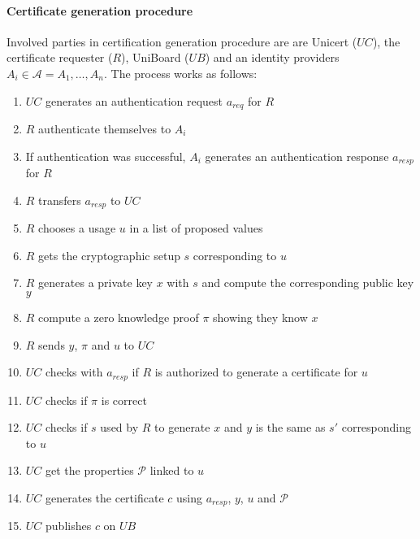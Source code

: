\documentclass[bibtotoc,halfparskip,oneside]{scrreprt}
\begin{document}
\paragraph*{Certificate generation procedure}
Involved parties in certification generation procedure are are Unicert ($UC$), the certificate requester ($R$), UniBoard ($UB$) and an identity providers $A_i \in \mathcal{A} = {A_1, \dots , A_n}$. The process works as follows:
\begin{enumerate}
	\item $UC$ generates an authentication request $a_{req}$ for $R$
	\item $R$ authenticate themselves to $A_i$
	\item If authentication was successful, $A_i$ generates an authentication response $a_{resp}$ for $R$
	\item $R$ transfers $a_{resp}$ to $UC$
	\item $R$ chooses a usage $u$ in a list of proposed values
	\item $R$ gets the cryptographic setup $s$ corresponding to $u$
	\item $R$ generates a private key $x$ with $s$ and compute the corresponding public key $y$
	\item $R$ compute a zero knowledge proof $\pi$ showing they know $x$
	\item $R$ sends $y$, $\pi$ and $u$ to $UC$
	\item $UC$ checks with $a_{resp}$ if $R$ is authorized to generate a certificate for $u$
	\item $UC$ checks if $\pi$ is correct
	\item $UC$ checks if $s$ used by $R$ to generate $x$ and $y$ is the same as $s'$ corresponding to $u$
	\item $UC$ get the properties $\mathcal{P}$ linked to $u$
	\item $UC$ generates the certificate $c$ using $a_{resp}$, $y$, $u$ and $\mathcal{P}$
	\item $UC$ publishes $c$ on $UB$
\end{enumerate} 

\end{document}
